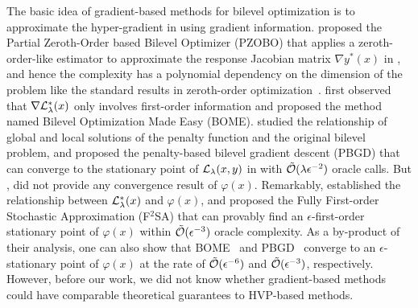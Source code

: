 \documentclass[twoside,11pt]{article}
\begin{document}
The basic idea of gradient-based methods for bilevel optimization is to approximate the hyper-gradient in  using gradient information. \citet{sow2022convergence} proposed the 
Partial Zeroth-Order based Bilevel Optimizer (PZOBO) that
applies a zeroth-order-like estimator to approximate the response Jacobian matrix $\nabla y^*(x) $ in , and hence 
the complexity has a polynomial 
dependency on the dimension of the problem like the standard results in zeroth-order optimization~\citep{duchi2015optimal,ghadimi2013stochastic,kornowski2023algorithm}. 
\citet{liu2022bome} first observed  that $\nabla {\mathcal{L}}_{\lambda}^*(x)$ only involves first-order information and proposed the method named Bilevel Optimization Made Easy (BOME).
{
\citet{shen2023penalty} studied the relationship of global and local solutions of the penalty function and the original bilevel problem, and proposed the penalty-based bilevel gradient descent (PBGD) that can converge to the stationary point of ${\mathcal{L}}_{\lambda}(x,y)$ in  with $\tilde{{\mathcal{O}}}(\lambda \epsilon^{-2})$ oracle calls.
But \citet{liu2022bome}, \citet{shen2023penalty} did not provide any convergence result of $\varphi(x)$.}
Remarkably, \citet{kwon2023fully}
established
the relationship between ${\mathcal{L}}_{\lambda}^*(x)$  and $\varphi(x)$, and proposed the Fully First-order Stochastic Approximation (F${}^2$SA) that can provably find an $\epsilon$-first-order stationary point of $\varphi(x)$ within $\tilde {{\mathcal{O}}}(\epsilon^{-3})$ oracle complexity. 
As a by-product of their analysis, one can also show that BOME~\citep{liu2022bome} and PBGD~\citep{shen2023penalty} converge to an $\epsilon$-stationary point of $\varphi(x)$ at the rate of $\tilde {{\mathcal{O}}}(\epsilon^{-6})$ and $\tilde {{\mathcal{O}}}(\epsilon^{-3})$, respectively.
However, before our work, we did not know whether gradient-based methods could have comparable theoretical guarantees to HVP-based methods.

\end{document}
